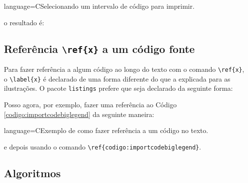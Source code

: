 \begin{codigo}{language=C}{Selecionando um intervalo de código para imprimir.}
\end{codigo}

\noindent
o resultado é:


\subsection{Referência \texttt{\textbackslash{ref\{x\}}} a um código fonte}

Para fazer referência a algum código ao longo do texto com o comando \Verb+\ref{x}+, o \Verb+\label{x}+ é declarado de uma forma diferente do que a explicada para as ilustrações. O pacote \texttt{listings} prefere que seja declarado da seguinte forma:

\begin{center}
\colorbox{black!8}{\ttfamily{}\hspace{\linewidth}\hspace{-2\fboxsep}}
\end{center}

\noindent
Posso agora, por exemplo, fazer uma referência ao Código \ref{codigo:importcodebiglegend} da seguinte maneira:

\begin{codigo}{language=C}{Exemplo de como fazer referência a um código no texto.}
\end{codigo}

\noindent
e depois usando o comando \Verb+\ref{codigo:importcodebiglegend}+.

\subsection{Algoritmos}

